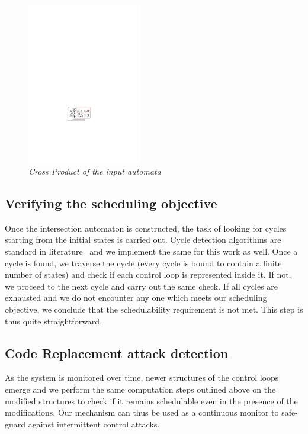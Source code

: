  
 \begin{figure}
\begin{center}
\includegraphics[width=50mm]{state_copy_transition.pdf}
\end{center}
\caption{{\em Cross Product of the input automata}}
\label{transition}
\end{figure}

\begin{figure}
\begin{center}
\end{center}
\label{fig:Algorithm}
\end{figure}

\subsection{Verifying the scheduling objective}
\noindent
Once the intersection automaton is constructed, the task of looking for cycles starting from the initial states is carried out. Cycle detection algorithms are standard in literature~\cite{Clarke:2000:MC:332656} and we implement the same for this work as well. Once a cycle is found, we traverse the cycle (every cycle is bound to contain a finite number of states) and check if each control loop is represented inside it. If not, we proceed to the next cycle and carry out the same check. If all cycles are exhausted and we do not encounter any one which meets our scheduling objective, we conclude that the schedulability requirement is not met. This step is thus quite straightforward.

\subsection{Code Replacement attack detection}
\noindent
As the system is monitored over time, newer structures of the control loops emerge and we perform the same computation steps outlined above on the modified structures to check if it remains schedulable even in the presence of the modifications. Our mechanism can thus be used as a continuous monitor to safe-guard against intermittent control attacks. 

